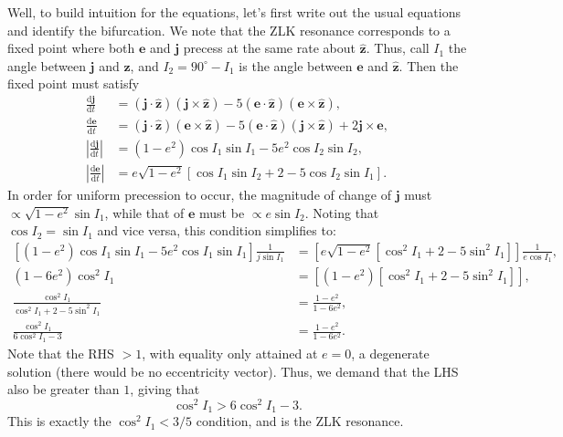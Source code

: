 \documentclass[12pt]{article}
\newcommand*{\rd}[2]{\frac{\mathrm{d}#1}{\mathrm{d}#2}}
\newcommand*{\bm}[1]{\boldsymbol{\mathbf{#1}}}
\newcommand*{\uv}[1]{\hat{\bm{#1}}}
\newcommand*{\abs}[1]{\left|#1\right|}
\newcommand*{\p}[1]{\left(#1\right)}
\newcommand*{\s}[1]{\left[#1\right]}
\begin{document}
Well, to build intuition for the equations, let's first write out the usual
equations and identify the bifurcation.
We note that the ZLK resonance corresponds to a fixed point where both $\bm{e}$
and $\bm{j}$ precess at the same rate about $\uv{z}$.
Thus, call $I_1$ the angle between $\bm{j}$ and $\uv{z}$, and $I_2 = 90^\circ -
I_1$ is the angle between $\bm{e}$ and $\uv{z}$.
Then the fixed point must satisfy
\begin{align}
    \rd{\bm{j}}{t}
        &=
            \p{\bm{j} \cdot \uv{z}} \p{\bm{j} \times \uv{z}}
            - 5 \p{\bm{e} \cdot \uv{z}} \p{\bm{e} \times \uv{z}},\\
    \rd{\bm{e}}{t}
        &=
            \p{\bm{j} \cdot \uv{z}} \p{\bm{e} \times \uv{z}}
            - 5 \p{\bm{e} \cdot \uv{z}} \p{\bm{j} \times \uv{z}}
            + 2\bm{j} \times \bm{e},\label{eq:ZLKbifurc_dedt}\\
    \abs{\rd{\bm{j}}{t}}
        &=
            (1 - e^2)\cos I_1 \sin I_1
                - 5e^2 \cos I_2\sin I_2,\\
    \abs{\rd{\bm{e}}{t}}
        &=
            e\sqrt{1 - e^2}
                \s{\cos I_1 \sin I_2
                    + 2
                    - 5\cos I_2 \sin I_1}.
\end{align}
In order for uniform precession to occur, the magnitude of change of $\bm{j}$
must $\propto \sqrt{1 - e^2}\sin I_1$, while that of $\bm{e}$ must be $\propto
e\sin I_2$.
Noting that $\cos I_2 = \sin I_1$ and vice versa, this condition simplifies to:
\begin{align}
    \s{(1 - e^2)\cos I_1 \sin I_1
               - 5e^2 \cos I_1\sin I_1}\frac{1}{j\sin I_1}
        &=
            \s{e\sqrt{1 - e^2}
                   \s{\cos^2 I_1
                       + 2
                       - 5\sin^2 I_1}}\frac{1}{e\cos I_1},\\
    (1 - 6e^2)\cos^2I_1
        &=
            \s{\p{1 - e^2}
                   \s{\cos^2 I_1
                       + 2
                       - 5\sin^2 I_1}},\\
    \frac{\cos^2 I_1}{
            \cos^2 I_1 + 2 - 5\sin^2 I_1}
        &=
            \frac{1 - e^2}{1 - 6e^2},\\
    \frac{\cos^2 I_1}{
            6\cos^2 I_1 - 3}
        &=
            \frac{1 - e^2}{1 - 6e^2}.
\end{align}
Note that the RHS $> 1$, with equality only attained at $e=0$, a degenerate
solution (there would be no eccentricity vector).
Thus, we demand that the LHS also be greater than $1$, giving that
\begin{equation}
    \cos^2 I_1 > 6\cos^2 I_1 - 3.
\end{equation}
This is exactly the $\cos^2 I_1 < 3/5$ condition, and is the ZLK resonance.
\end{document}
